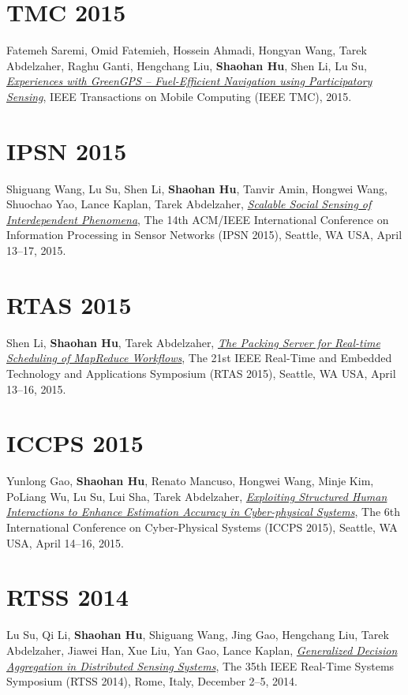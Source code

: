 \section{\sc TMC 2015}\hypertarget{saremi2015tmc}{} Fatemeh Saremi, Omid Fatemieh, Hossein Ahmadi, Hongyan Wang, Tarek Abdelzaher, Raghu Ganti, Hengchang Liu, \textbf{Shaohan Hu}, Shen Li, Lu Su, \href{http://ieeexplore.ieee.org/xpl/articleDetails.jsp?tp=&arnumber=7084108}{\emph{Experiences with GreenGPS -- Fuel-Efficient Navigation using Participatory Sensing}}, \textsf{IEEE Transactions on Mobile Computing (IEEE TMC)}, 2015.

\section{\sc IPSN 2015}\hypertarget{wang2015ipsn}{} Shiguang Wang, Lu Su, Shen Li, \textbf{Shaohan Hu}, Tanvir Amin, Hongwei Wang, Shuochao Yao, Lance Kaplan, Tarek Abdelzaher, \href{http://dl.acm.org/citation.cfm?id=2737114}{\emph{Scalable Social Sensing of Interdependent Phenomena}}, \textsf{The 14th ACM/IEEE International Conference on Information Processing in Sensor Networks (IPSN 2015)}, Seattle, WA USA, April 13--17, 2015.

\section{\sc RTAS 2015}\hypertarget{li2015rtas}{} Shen Li, \textbf{Shaohan Hu}, Tarek Abdelzaher, \href{http://ieeexplore.ieee.org/xpl/articleDetails.jsp?tp=&arnumber=7108416}{\emph{The Packing Server for Real-time Scheduling of MapReduce Workflows}}, \textsf{The 21st IEEE Real-Time and Embedded Technology and Applications Symposium (RTAS 2015)}, Seattle, WA USA, April 13--16, 2015.

\section{\sc ICCPS 2015}\hypertarget{gao2015iccps}{} Yunlong Gao, \textbf{Shaohan Hu}, Renato Mancuso, Hongwei Wang, Minje Kim, PoLiang Wu, Lu Su, Lui Sha, Tarek Abdelzaher, \href{http://dl.acm.org/citation.cfm?id=2735960.2735965}{\emph{Exploiting Structured Human Interactions to Enhance Estimation Accuracy in Cyber-physical Systems}}, \textsf{The 6th International Conference on Cyber-Physical Systems (ICCPS 2015)}, Seattle, WA USA, April 14--16, 2015.

\section{\sc RTSS 2014}\hypertarget{su2014rtss}{} Lu Su, Qi Li, \textbf{Shaohan Hu}, Shiguang Wang, Jing Gao, Hengchang Liu, Tarek Abdelzaher, Jiawei Han, Xue Liu, Yan Gao, Lance Kaplan, \href{http://ieeexplore.ieee.org/xpl/articleDetails.jsp?arnumber=7010369}{\emph{Generalized Decision Aggregation in Distributed Sensing Systems}}, \textsf{The 35th IEEE Real-Time Systems Symposium (RTSS 2014)}, Rome, Italy, December 2--5, 2014.

